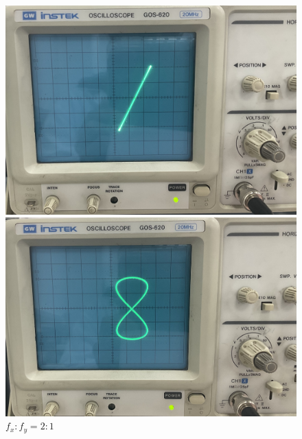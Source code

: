 \documentclass[UTF8]{ctexart}
\begin{document}
\begin{figure}[H]
	\centering
	\begin{minipage}{0.49\linewidth}
		\centering
		\includegraphics[width=0.9\linewidth]{img1/1比1.jpg}
		\caption*{$f_x:f_y=1:1$}
	\end{minipage}
	\begin{minipage}{0.49\linewidth}
		\centering
		\includegraphics[width=0.9\linewidth]{img1/2比1.jpg}
		\caption*{$f_x:f_y=2:1$}
	\end{minipage}
	

\end{figure}
\end{document}

